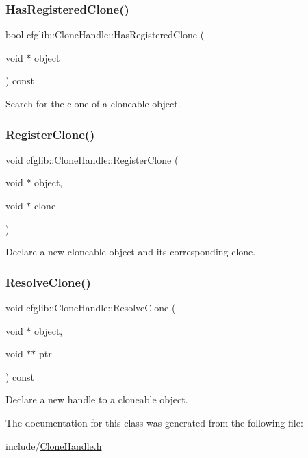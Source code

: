 \subsubsection{\texorpdfstring{Has\+Registered\+Clone()}{HasRegisteredClone()}}
{\footnotesize\ttfamily bool cfglib\+::\+Clone\+Handle\+::\+Has\+Registered\+Clone (\begin{DoxyParamCaption}\item[{void $\ast$}]{object }\end{DoxyParamCaption}) const}

Search for the clone of a cloneable object. \mbox{\label{classcfglib_1_1CloneHandle_aa36eb7a49ba2b5c4a02e3ac1d99e4197}} 
\subsubsection{\texorpdfstring{Register\+Clone()}{RegisterClone()}}
{\footnotesize\ttfamily void cfglib\+::\+Clone\+Handle\+::\+Register\+Clone (\begin{DoxyParamCaption}\item[{void $\ast$}]{object,  }\item[{void $\ast$}]{clone }\end{DoxyParamCaption})}

Declare a new cloneable object and its corresponding clone. \mbox{\label{classcfglib_1_1CloneHandle_a16170b69d74009e625dcf968b65cfdc7}} 
\subsubsection{\texorpdfstring{Resolve\+Clone()}{ResolveClone()}}
{\footnotesize\ttfamily void cfglib\+::\+Clone\+Handle\+::\+Resolve\+Clone (\begin{DoxyParamCaption}\item[{void $\ast$}]{object,  }\item[{void $\ast$$\ast$}]{ptr }\end{DoxyParamCaption}) const}

Declare a new handle to a cloneable object. 

The documentation for this class was generated from the following file\+:\begin{DoxyCompactItemize}
\item 
include/\hyperlink{CloneHandle_8h}{Clone\+Handle.\+h}\end{DoxyCompactItemize}
